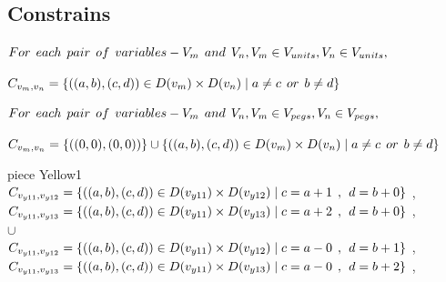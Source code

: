 \subsection{Constrains}
 $For \hspace{1ex} each \hspace{1ex} pair\hspace{1ex} of \hspace{1ex}variables-V_{m} \hspace{1ex} and \hspace{1ex} V_{n}, V_{m} \in V_{units}, V_{n} \in V_{units},$
\begin{center}
$C_{v_{m},v_{n}}=\{((a,b),(c,d))\in D(v_{m}) \times D(v_{n})\mid a \neq c   \hspace{1ex} or \hspace{1ex}  b \neq d\}$
\end{center}
$For \hspace{1ex} each \hspace{1ex} pair \hspace{1ex} of\hspace{1ex} variables-V_{m}\hspace{1ex} and \hspace{1ex}V_{n}, V_{m} \in V_{pegs}, V_{n} \in V_{pegs},$
\begin{center}
$C_{v_{m},v_{n}}=\{((0,0),(0,0))\}\cup \{((a,b),(c,d))\in D(v_{m})\times D(v_{n})\mid a \neq c   \hspace{1ex} or \hspace{1ex}  b \neq d\}$\\
\end{center}
 piece Yellow1
\\$C_{v_{y11},v_{y12}}=\{((a,b),(c,d))\in D(v_{y11})\times D(v_{y12})\mid c = a + 1\hspace{1ex} , \hspace{1ex}  d = b + 0 \}$ , 
\\$C_{v_{y11},v_{y13}}=\{((a,b),(c,d))\in D(v_{y11})\times D(v_{y13})\mid c = a + 2\hspace{1ex} , \hspace{1ex}  d = b + 0 \}$ , 
\\$\cup$
\\$C_{v_{y11},v_{y12}}=\{((a,b),(c,d))\in D(v_{y11})\times D(v_{y12})\mid c = a - 0\hspace{1ex} , \hspace{1ex}  d = b + 1 \}$ , 
\\$C_{v_{y11},v_{y13}}=\{((a,b),(c,d))\in D(v_{y11})\times D(v_{y13})\mid c = a - 0\hspace{1ex} , \hspace{1ex}  d = b + 2 \}$ , 
